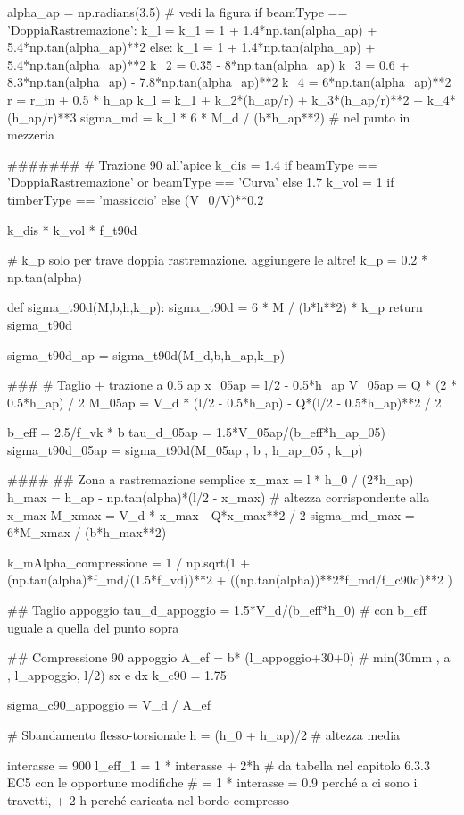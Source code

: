 \begin{pycode}[TraveDoppiaRastremazione]
alpha_ap = np.radians(3.5) # vedi la figura
if beamType == 'DoppiaRastremazione':
    k_l = k_1 = 1 + 1.4*np.tan(alpha_ap) + 5.4*np.tan(alpha_ap)**2
else:
    k_1 = 1 + 1.4*np.tan(alpha_ap) + 5.4*np.tan(alpha_ap)**2
    k_2 = 0.35 - 8*np.tan(alpha_ap)
    k_3 = 0.6 + 8.3*np.tan(alpha_ap) - 7.8*np.tan(alpha_ap)**2
    k_4 = 6*np.tan(alpha_ap)**2
    r = r_in + 0.5 * h_ap
    k_l = k_1 + k_2*(h_ap/r) + k_3*(h_ap/r)**2 + k_4*(h_ap/r)**3
sigma_md = k_l * 6 * M_d / (b*h_ap**2) # nel punto in mezzeria

#######
# Trazione 90 all'apice
k_dis =  1.4 if beamType == 'DoppiaRastremazione' or  beamType == 'Curva' else  1.7
k_vol = 1 if timberType == 'massiccio' else (V_0/V)**0.2 

k_dis * k_vol * f_t90d

# k_p solo per trave doppia rastremazione. aggiungere le altre!
k_p = 0.2 * np.tan(alpha) 

def sigma_t90d(M,b,h,k_p):
    sigma_t90d = 6 * M / (b*h**2) * k_p
    return sigma_t90d

sigma_t90d_ap = sigma_t90d(M_d,b,h_ap,k_p)

###
# Taglio + trazione a 0.5 ap
x_05ap = l/2 - 0.5*h_ap
V_05ap = Q * (2 * 0.5*h_ap) / 2
M_05ap = V_d * (l/2 - 0.5*h_ap) - Q*(l/2 - 0.5*h_ap)**2 / 2


b_eff = 2.5/f_vk * b
tau_d_05ap = 1.5*V_05ap/(b_eff*h_ap_05)
sigma_t90d_05ap = sigma_t90d(M_05ap , b , h_ap_05 , k_p)

####
## Zona a rastremazione semplice
x_max = l * h_0 / (2*h_ap)
h_max = h_ap - np.tan(alpha)*(l/2 - x_max) # altezza corrispondente alla x_max
M_xmax = V_d * x_max - Q*x_max**2 / 2
sigma_md_max = 6*M_xmax / (b*h_max**2)


k_mAlpha_compressione = 1 / np.sqrt(1 + (np.tan(alpha)*f_md/(1.5*f_vd))**2 + ((np.tan(alpha))**2*f_md/f_c90d)**2 )

## Taglio appoggio
tau_d_appoggio = 1.5*V_d/(b_eff*h_0)
# con b_eff uguale a quella del punto sopra

## Compressione 90 appoggio
A_ef = b* (l_appoggio+30+0) # min(30mm , a , l_appoggio, l/2) sx e dx
k_c90 = 1.75

sigma_c90_appoggio = V_d / A_ef

# Sbandamento flesso-torsionale
h = (h_0 + h_ap)/2 # altezza media

interasse = 900
l_eff_1 = 1 * interasse + 2*h # da tabella nel capitolo 6.3.3 EC5 con le opportune modifiche
# = 1 * interasse = 0.9 perché a ci sono i travetti, + 2 h perché caricata nel bordo compresso


\end{pycode}
